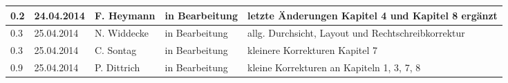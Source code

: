 \begin{longtable}{|m{1.78cm}|m{1.59cm}|m{2.86cm}|m{1.9cm}|m{5.25cm}|}
  \hline
  0.2    &    24.04.2014    &   F. Heymann  &    in Bearbeitung    &   
   letzte Änderungen Kapitel 4 und Kapitel 8 ergänzt\\  
  \hline
  0.3    &    25.04.2014    &   N. Widdecke &    in Bearbeitung    & allg. Durchsicht, Layout und Rechtschreibkorrektur \\
  \hline
  0.3    &    25.04.2014    &   C. Sontag &    in Bearbeitung    & kleinere Korrekturen Kapitel 7 \\
  \hline
  0.9    &    25.04.2014    &   P. Dittrich &    in Bearbeitung    & kleine
  Korrekturen an Kapiteln 1, 3, 7, 8
  \\
  \hline

\end{longtable}


%

